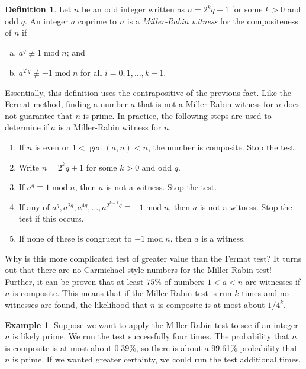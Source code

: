 \documentclass{book}
\theoremstyle{plain}
\theoremstyle{definition}
\newtheorem{definition}[theorem]{Definition}
\newtheorem{example}[theorem]{Example}
\renewcommand{\mod}{\operatorname{mod}}
\renewcommand{\mod}{\operatorname{mod}}
\begin{document}
\begin{definition}
Let $n$ be an odd integer written as $n = 2^kq + 1$ for some $k>0$ and odd $q$. An integer $a$ coprime to $n$ is a {\it Miller-Rabin witness} for the compositeness of $n$ if
\begin{enumerate}[(a)]
\item $a^q \not\equiv 1 \mod n$; and
\item $a^{2^iq} \not\equiv -1 \mod n$ for all $i = 0,1,\ldots,k-1$.
\end{enumerate}
\end{definition}

Essentially, this definition uses the contrapositive of the previous fact. Like the Fermat method, finding a number $a$ that is not a Miller-Rabin witness for $n$ does not guarantee that $n$ is prime. In practice, the following steps are used to determine if $a$ is a Miller-Rabin witness for $n$.
\begin{enumerate}
\item If $n$ is even or $1 < \gcd(a,n) < n$, the number is composite. Stop the test.
\item Write $n = 2^kq + 1$ for some $k>0$ and odd $q$.
\item If $a^q \equiv 1 \mod n$, then $a$ is not a witness. Stop the test.
\item If any of $a^q,a^{2q},a^{4q},\ldots,a^{2^{k-1}q} \equiv -1 \mod n$, then $a$ is not a witness. Stop the test if this occurs.
\item If none of these is congruent to $-1 \mod n$, then $a$ is a witness.
\end{enumerate}

Why is this more complicated test of greater value than the Fermat test? It turns out that there are no Carmichael-style numbers for the Miller-Rabin test! Further, it can be proven that at least $75\%$ of numbers $1 < a < n$ are witnesses if $n$ is composite. This means that if the Miller-Rabin test is run $k$ times and no witnesses are found, the likelihood that $n$ is composite is at most about $1/4^k$.

\begin{example}
Suppose we want to apply the Miller-Rabin test to see if an integer $n$ is likely prime. We run the test successfully four times. The probability that $n$ is composite is at most about 0.39\%, so there is about a 99.61\% probability that $n$ is prime. If we wanted greater certainty, we could run the test additional times.
\end{example}
\end{document}
